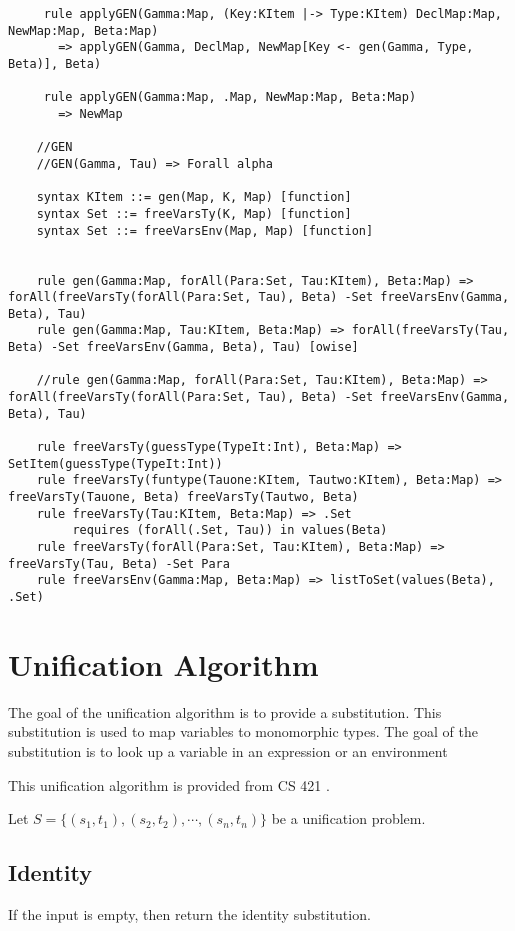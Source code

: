 \begin{lstlisting}
     rule applyGEN(Gamma:Map, (Key:KItem |-> Type:KItem) DeclMap:Map, NewMap:Map, Beta:Map)
       => applyGEN(Gamma, DeclMap, NewMap[Key <- gen(Gamma, Type, Beta)], Beta)

     rule applyGEN(Gamma:Map, .Map, NewMap:Map, Beta:Map)
       => NewMap

    //GEN
    //GEN(Gamma, Tau) => Forall alpha

    syntax KItem ::= gen(Map, K, Map) [function]
    syntax Set ::= freeVarsTy(K, Map) [function]
    syntax Set ::= freeVarsEnv(Map, Map) [function]


    rule gen(Gamma:Map, forAll(Para:Set, Tau:KItem), Beta:Map) => forAll(freeVarsTy(forAll(Para:Set, Tau), Beta) -Set freeVarsEnv(Gamma, Beta), Tau)
    rule gen(Gamma:Map, Tau:KItem, Beta:Map) => forAll(freeVarsTy(Tau, Beta) -Set freeVarsEnv(Gamma, Beta), Tau) [owise]

    //rule gen(Gamma:Map, forAll(Para:Set, Tau:KItem), Beta:Map) => forAll(freeVarsTy(forAll(Para:Set, Tau), Beta) -Set freeVarsEnv(Gamma, Beta), Tau)

    rule freeVarsTy(guessType(TypeIt:Int), Beta:Map) => SetItem(guessType(TypeIt:Int))
    rule freeVarsTy(funtype(Tauone:KItem, Tautwo:KItem), Beta:Map) => freeVarsTy(Tauone, Beta) freeVarsTy(Tautwo, Beta)
    rule freeVarsTy(Tau:KItem, Beta:Map) => .Set
         requires (forAll(.Set, Tau)) in values(Beta)
    rule freeVarsTy(forAll(Para:Set, Tau:KItem), Beta:Map) => freeVarsTy(Tau, Beta) -Set Para
    rule freeVarsEnv(Gamma:Map, Beta:Map) => listToSet(values(Beta), .Set)
\end{lstlisting}
\section{Unification Algorithm}

The goal of the unification algorithm is to provide a substitution. This substitution is used to map variables to monomorphic types. The goal of the substitution is to look up a variable in an expression or an environment 

This unification algorithm is provided from CS 421 \cite{CS421:Unif}.

Let $S = \{(s_1 , t_1), (s_2 , t_2), \cdots, (s_n , t_n)\}$ be a
unification problem.

\subsection{Identity}
If the input is empty, then return the identity substitution.

